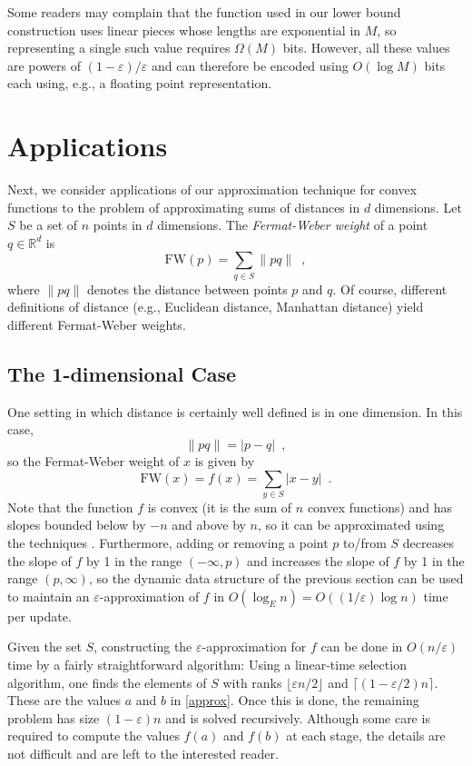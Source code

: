 \documentclass[charterfonts,lotsofwhite]{patmorin}
\newcommand{\fw}{\mathrm{FW}}
\newcommand{\eps}{\varepsilon}
\newcommand{\Real}{\mathbb{R}}
\begin{document}
\begin{rem}
Some readers may complain that the function used in our lower bound
construction uses linear pieces whose lengths are exponential in $M$,
so representing a single such value requires $\Omega(M)$ bits.
However, all these values are powers of $(1-\eps)/\eps$ and can
therefore be encoded using $O(\log M)$ bits each using, e.g., a
floating point representation.
\end{rem}

\section{Applications}

Next, we consider applications of our approximation technique for
convex functions to the problem of approximating sums of distances in
$d$ dimensions.  Let $S$ be a set of $n$ points in $d$ dimensions.
The \emph{Fermat-Weber weight} of a point $q\in\Real^d$ is
\[
   \fw(p) = \sum_{q\in S} \|pq\| \enspace ,
\]
where $\|pq\|$ denotes the distance between points $p$ and $q$. Of
course, different definitions of distance (e.g., Euclidean distance,
Manhattan distance) yield different Fermat-Weber weights.

\subsection{The 1-dimensional Case}

One setting in which distance is certainly well defined is in one
dimension.  In this case,
\[ 
\|pq\| = |p-q| \enspace ,
\]
so the Fermat-Weber weight of $x$ is given by
\[
   \fw(x) = f(x) = \sum_{y\in S} |x-y|  \enspace .
\]
Note that the function $f$ is convex (it is the sum of $n$ convex
functions) and has slopes bounded below by $-n$ and above by $n$, so
it can be approximated using the techniques .  Furthermore,
adding or removing a point $p$ to/from $S$ decreases the slope of $f$
by 1 in the range $(-\infty,p)$ and increases the slope of $f$ by 1 in
the range $(p,\infty)$, so the dynamic data structure of the previous
section can be used to maintain an $\eps$-approximation of $f$ in
$O(\log_E n)= O((1/\eps) \log n)$ time per update.

Given the set $S$, constructing the $\eps$-approximation for $f$
can be done in $O(n/\eps)$ time by a fairly straightforward
algorithm:  Using a linear-time selection algorithm, one finds the
elements of $S$ with ranks $\lfloor\eps n/2\rfloor$ and
$\lceil(1-\eps/2) n\rceil$.  These are the values $a$ and $b$ in
\eqref{approx}.  Once this is done, the remaining problem has size
$(1-\eps) n$ and is solved recursively.  Although some care is
required to compute the values $f(a)$ and $f(b)$ at each stage, the
details are not difficult and are left to the interested reader.
\end{document}
